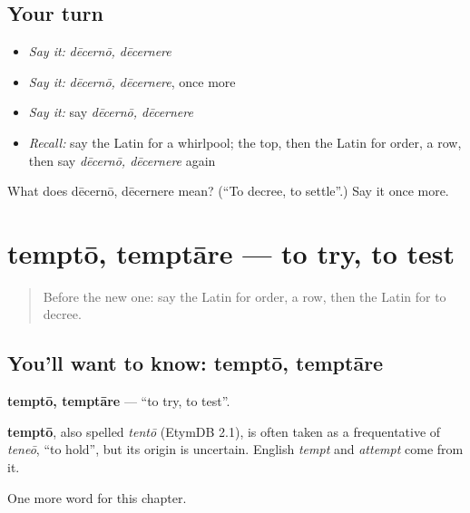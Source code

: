 \subsection*{Your turn}
\begin{itemize}
\raggedright
  \item \emph{Say it:} \emph{dēcernō, dēcernere}
  \item \emph{Say it:} \emph{dēcernō, dēcernere}, once more
  \item \emph{Say it:} say \emph{dēcernō, dēcernere}
  \item \emph{Recall:} say the Latin for a whirlpool; the top, then the Latin for order, a row, then say \emph{dēcernō, dēcernere} again
\end{itemize}

\begin{tcolorbox}[breakable,colback=teal!4,colframe=teal!35!black,title={Before you move on}]
What does dēcernō, dēcernere mean? (\textquotedblleft{}To decree, to settle\textquotedblright{}.) Say it once more.
\end{tcolorbox}
\section[temptō, temptāre]{temptō, temptāre — to try, to test}

\label{lesson:LA-C229-tempto}



\begin{quote}
Before the new one: say the Latin for order, a row, then the Latin for to decree.
\end{quote}

\subsection*{You'll want to know: temptō, temptāre}
\textbf{temptō, temptāre} — \textquotedblleft{}to try, to test\textquotedblright{}.

\begin{cousinweb}
\textbf{temptō}, also spelled \emph{tentō} (EtymDB 2.1), is often taken as a frequentative of \emph{teneō}, \textquotedblleft{}to hold\textquotedblright{}, but its origin is uncertain. English \emph{tempt} and \emph{attempt} come from it.
\end{cousinweb}

\begin{grammarlens}[title={What you've built}]
One more word for this chapter.
\end{grammarlens}


